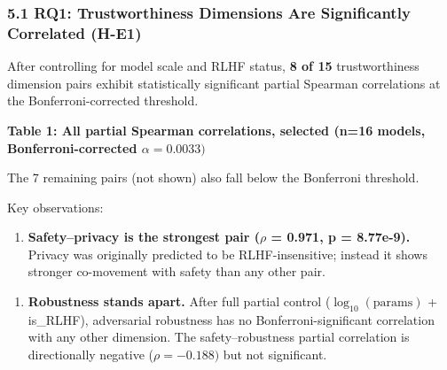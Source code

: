 
\subsubsection{5.1 RQ1: Trustworthiness Dimensions Are Significantly Correlated (H-E1)}

After controlling for model scale and RLHF status, \textbf{8 of 15} trustworthiness dimension pairs exhibit statistically significant partial Spearman correlations at the Bonferroni-corrected threshold.

\textbf{Table 1: All partial Spearman correlations, selected (n=16 models, Bonferroni-corrected $\alpha =0.0033)$}

\begin{table}[htbp]
\centering
{}
\end{table}

The 7 remaining pairs (not shown) also fall below the Bonferroni threshold.

Key observations:

\begin{enumerate}
\item \textbf{Safety--privacy is the strongest pair ($\rho$ = 0.971, p = 8.77e-9).} Privacy was originally predicted to be RLHF-insensitive; instead it shows stronger co-movement with safety than any other pair.
\end{enumerate}

\begin{enumerate}
\item \textbf{Robustness stands apart.} After full partial control ($\log_{10}(\text{params})$ + is\_RLHF), adversarial robustness has no Bonferroni-significant correlation with any other dimension. The safety--robustness partial correlation is directionally negative ($\rho = -0.188)$ but not significant.
\end{enumerate}

